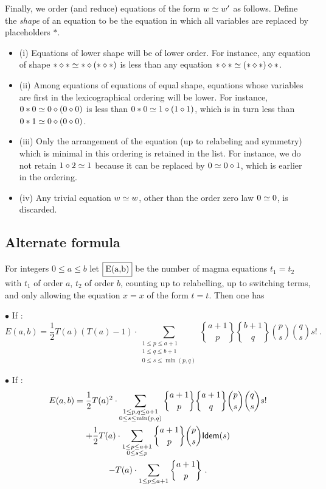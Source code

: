 Finally, we order (and reduce) equations of the form $w \simeq w'$ as follows. Define the \emph{shape} of an equation to be the equation in which all variables are replaced by placeholders $\ast$.
\begin{itemize}
  \item (i) Equations of lower shape will be of lower order.  For instance, any equation of shape $\ast \diamond \ast \simeq \ast \diamond (\ast \diamond \ast)$ is less than any equation $\ast \diamond \ast \simeq (\ast \diamond \ast) \diamond \ast$.
  \item (ii) Among equations of equations of equal shape, equations whose variables are first in the lexicographical ordering will be lower. For instance, $0 \ast 0 \simeq 0 \diamond (0 \diamond 0)$ is less than $0 \ast 0 \simeq 1 \diamond (1 \diamond 1)$, which is in turn less than $0 \ast 1 \simeq 0 \diamond (0 \diamond 0)$.
  \item (iii) Only the arrangement of the equation (up to relabeling and symmetry) which is minimal in this ordering is retained in the list.  For instance, we do not retain $1 \diamond 2 \simeq 1$ because it can be replaced by $0 \simeq 0 \diamond 1$, which is earlier in the ordering.
\item (iv) Any trivial equation $w \simeq w$, other than the order zero law $0 \simeq 0$, is discarded.
\end{itemize}

\subsection{Alternate formula}

For integers $0 \le a \le b$ let $\fbox{E(a,b)}$ be the number of magma equations $t_1 = t_2$ with $t_1$ of order $a$, $t_2$ of order $b$, counting up to relabelling, up to switching terms, and only allowing the equation $x=x$ of the form $t=t$.  Then one has

\pagebreak
$\bullet$ If :
$$
E(a,b) = \frac{1}{2} T(a)(T(a) - 1)\cdot \sum_{\substack{1 \le p \le a+1\\ 1 \le q \le b+1\\0\le s \le \min(p,q)}}
{a+1 \brace p} {b+1 \brace q} {p \choose s} {q \choose s} s! \ .
$$

$\bullet$ If :
\begin{multline*}
E(a,b) = \frac{1}{2} T(a)^2\cdot \sum_{\substack{1 \le p,q \le a+1\\ 0\le s \le \min(p,q)}}
{a+1 \brace p} {a+1 \brace q} {p \choose s} \binom{q}{s} s! \\
+ \frac{1}{2} T(a) \cdot \sum_{\substack{1 \le p \le a+1\\ 0\le s \le p}}
{a+1 \brace p}  \binom{p}{s} {\sf Idem}(s)\\
- T(a)\cdot \sum_{1\le p \le a+1}  {a+1 \brace p} \ .
\end{multline*}

